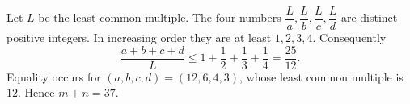 Let $L$ be the least common multiple. The four numbers $\dfrac{L}{a},\dfrac{L}{b},\dfrac{L}{c},\dfrac{L}{d}$ are distinct positive integers. In increasing order they are at least $1,2,3,4$. Consequently
\[
\dfrac{a+b+c+d}{L}\le1+\dfrac{1}{2}+\dfrac{1}{3}+\dfrac{1}{4}=\dfrac{25}{12}.
\]
Equality occurs for $(a,b,c,d)=(12,6,4,3)$, whose least common multiple is $12$. Hence $\boxed{m+n=37}$.
